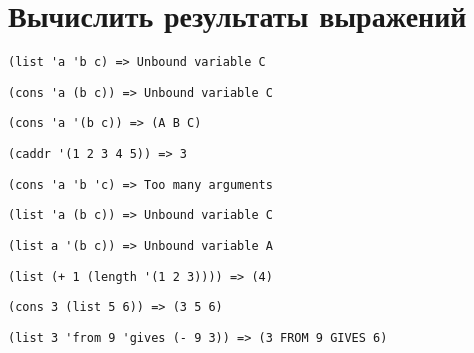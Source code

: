 \section{Вычислить результаты выражений}

\problem \hfill

\begin{lstlisting}
(list 'a 'b c) => Unbound variable C
\end{lstlisting}


\problem \hfill

\begin{lstlisting}
(cons 'a (b c)) => Unbound variable C
\end{lstlisting}


\problem \hfill

\begin{lstlisting}
(cons 'a '(b c)) => (A B C) 
\end{lstlisting}


\problem \hfill

\begin{lstlisting}
(caddr '(1 2 3 4 5)) => 3
\end{lstlisting}


\problem \hfill

\begin{lstlisting}
(cons 'a 'b 'c) => Too many arguments
\end{lstlisting}


\problem \hfill

\begin{lstlisting}
(list 'a (b c)) => Unbound variable C
\end{lstlisting}


\problem \hfill

\begin{lstlisting}
(list a '(b c)) => Unbound variable A
\end{lstlisting}


\problem \hfill

\begin{lstlisting}
(list (+ 1 (length '(1 2 3)))) => (4) 
\end{lstlisting}


\problem \hfill

\begin{lstlisting}
(cons 3 (list 5 6)) => (3 5 6)
\end{lstlisting}


\problem \hfill

\begin{lstlisting}
(list 3 'from 9 'gives (- 9 3)) => (3 FROM 9 GIVES 6) 
\end{lstlisting}


